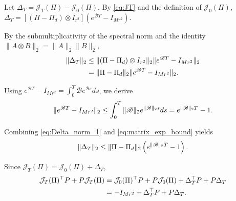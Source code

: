 \documentclass[conference]{IEEEtran}
\begin{document}
	\begin{IEEEproof}
		Let $\Delta_T = \mathcal{J}_T(\Pi) - \mathcal{J}_0(\Pi)$. By \eqref{eq:JT} and the definition of $\mathcal{J}_0(\Pi)$,
		$
		\Delta_T
		=
		\left[
		(\Pi-\Pi_d)\otimes I_{r^2}
		\right]
		\left(
		e^{\mathscr{B}T}
		-
		I_{Mr^2}
		\right).
		\label{eq:DeltaT}			
		$
		
		By the submultiplicativity of the spectral norm and the identity $\|A\otimes B\|_2 = \|A\|_2\|B\|_2$,
		\vspace{-0.2\baselineskip}
		\begin{align}
			\|\Delta_T\|_2
			&\leq
			\|(\Pi-\Pi_d)\otimes I_{r^2}\|_2
			\|e^{\mathscr{B}T} - I_{Mr^2}\|_2
			\nonumber\\
			&=
			\|\Pi-\Pi_d\|_2
			\|e^{\mathscr{B}T} - I_{Mr^2}\|_2.
			\label{eq:Delta_norm_1}	
			\vspace{-0.2\baselineskip}		
		\end{align}
		
		Using $e^{\mathscr{B}T} - I_{Mr^2} = \int_0^T \mathscr{B} e^{\mathscr{B}s} ds$, we derive
		\vspace{-0.2\baselineskip}
		\begin{align}
			\|e^{\mathscr{B}T} - I_{Mr^2}\|_2
			\leq
			\int_0^T
			\|\mathscr{B}\|_2
			e^{\|\mathscr{B}\|_2 s}
			ds
			=
			e^{\|\mathscr{B}\|_2 T}
			-
			1.
			\label{eq:matrix_exp_bound}	
			\vspace{-0.2\baselineskip}		
		\end{align}
		
		Combining \eqref{eq:Delta_norm_1} and \eqref{eq:matrix_exp_bound} yields
		\vspace{-0.2\baselineskip}
		\begin{equation}
			\|\Delta_T\|_2
			\leq
			\|\Pi-\Pi_d\|_2
			\left(
			e^{\|\mathscr{B}\|_2 T}
			-
			1
			\right).
			\label{eq:Delta_norm_bound}		
			\vspace{-0.2\baselineskip}
		\end{equation}
		
		Since $\mathcal{J}_T(\Pi) = \mathcal{J}_0(\Pi) + \Delta_T$,
		\vspace{-0.2\baselineskip}
		\begin{align}
			\mathcal{J}_T(\Pi)^\top P
			+
			P\mathcal{J}_T(\Pi)
			&=
			\mathcal{J}_0(\Pi)^\top P + P\mathcal{J}_0(\Pi) + \Delta_T^\top P + P\Delta_T
			\nonumber\\
			&=
			-I_{Mr^2} + \Delta_T^\top P + P\Delta_T.
			\label{eq:JT_Lyapunov_expansion}
			\vspace{-0.2\baselineskip}
		\end{align}
		

\end{IEEEproof}
\end{document}

